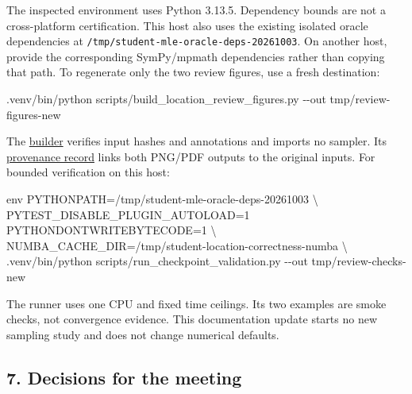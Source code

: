 \documentclass[
  10pt,
]{article}
\newenvironment{Shaded}{}{}
\newcommand{\AttributeTok}[1]{\textcolor[rgb]{0.49,0.56,0.16}{#1}}
\newcommand{\DataTypeTok}[1]{\textcolor[rgb]{0.56,0.13,0.00}{#1}}
\newcommand{\ExtensionTok}[1]{#1}
\newcommand{\FunctionTok}[1]{\textcolor[rgb]{0.02,0.16,0.49}{#1}}
\newcommand{\NormalTok}[1]{#1}
\begin{document}
The inspected environment uses Python 3.13.5. Dependency bounds are not
a cross-platform certification. This host also uses the existing
isolated oracle dependencies at
\texttt{/tmp/student-mle-oracle-deps-20261003}. On another host, provide
the corresponding SymPy/mpmath dependencies rather than copying that
path. To regenerate only the two review figures, use a fresh
destination:

\begin{Shaded}
\begin{Highlighting}[]
\ExtensionTok{.venv/bin/python}\NormalTok{ scripts/build\_location\_review\_figures.py }\AttributeTok{{-}{-}out}\NormalTok{ tmp/review{-}figures{-}new}
\end{Highlighting}
\end{Shaded}

The \href{../../scripts/build_location_review_figures.py}{builder}
verifies input hashes and annotations and imports no sampler. Its
\href{evidence/location_review_handoff_2026-10-12/figures/provenance.json}{provenance
record} links both PNG/PDF outputs to the original inputs. For bounded
verification on this host:

\begin{Shaded}
\begin{Highlighting}[]
\FunctionTok{env}\NormalTok{ PYTHONPATH=/tmp/student{-}mle{-}oracle{-}deps{-}20261003 }\DataTypeTok{\textbackslash{}}
\NormalTok{  PYTEST\_DISABLE\_PLUGIN\_AUTOLOAD=1 PYTHONDONTWRITEBYTECODE=1 }\DataTypeTok{\textbackslash{}}
\NormalTok{  NUMBA\_CACHE\_DIR=/tmp/student{-}location{-}correctness{-}numba }\DataTypeTok{\textbackslash{}}
\NormalTok{  .venv/bin/python scripts/run\_checkpoint\_validation.py }\AttributeTok{{-}{-}out}\NormalTok{ tmp/review{-}checks{-}new}
\end{Highlighting}
\end{Shaded}

The runner uses one CPU and fixed time ceilings. Its two examples are
smoke checks, not convergence evidence. This documentation update starts
no new sampling study and does not change numerical defaults.

\subsection{7. Decisions for the
meeting}\label{decisions-for-the-meeting}
\end{document}

